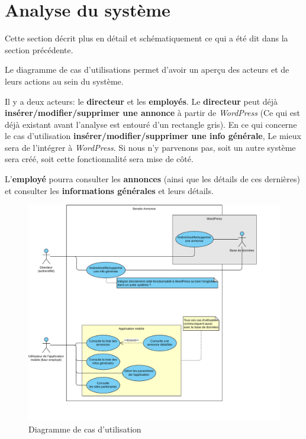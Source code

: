 \documentclass[french]{report}
\begin{document}
\section{Analyse du système}
Cette section décrit plus en détail et schématiquement ce qui a été dit dans la
section précédente.

Le diagramme de cas d'utilisations permet d'avoir un aperçu des acteurs et de leurs actions au sein du
système.

Il y a deux acteurs: le \textbf{directeur} et les \textbf{employés}. Le \textbf{directeur}
peut déjà \textbf{insérer/modifier/supprimer une annonce} à partir de
\textit{WordPress} (Ce qui est déjà existant avant l'analyse est entouré d'un
rectangle gris). En ce qui concerne le cas d'utilisation
\textbf{insérer/modifier/supprimer une info générale}, Le mieux sera de l'intégrer
à \textit{WordPress}. Si nous n'y parvenons pas, soit un autre système
sera créé, soit cette fonctionnalité sera mise de côté.

L'\textbf{employé} pourra consulter les \textbf{annonces} (ainsi que les détails de ces dernières)
et consulter les \textbf{informations générales} et leurs détails. 

\begin{figure}[H]
    \centering
    \includegraphics[width=\textwidth]{../diags/serado_uc.pdf}
    \caption{Diagramme de cas d'utilisation}
    \label{fig:use_case_diagram}
\end{figure}
\end{document}

